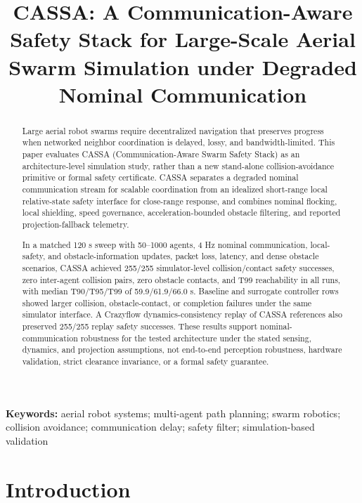 \documentclass[11pt]{article}
\title{\textbf{CASSA: A Communication-Aware Safety Stack for Large-Scale Aerial Swarm Simulation under Degraded Nominal Communication}}
\author{}
\date{}
\begin{document}
\maketitle

\begin{abstract}
Large aerial robot swarms require decentralized navigation that preserves progress when networked neighbor coordination is delayed, lossy, and bandwidth-limited. This paper evaluates CASSA (Communication-Aware Swarm Safety Stack) as an architecture-level simulation study, rather than a new stand-alone collision-avoidance primitive or formal safety certificate. CASSA separates a degraded nominal communication stream for scalable coordination from an idealized short-range local relative-state safety interface for close-range response, and combines nominal flocking, local shielding, speed governance, acceleration-bounded obstacle filtering, and reported projection-fallback telemetry.

In a matched 120 s sweep with 50--1000 agents, 4 Hz nominal communication, local-safety, and obstacle-information updates, packet loss, latency, and dense obstacle scenarios, CASSA achieved 255/255 simulator-level collision/contact safety successes, zero inter-agent collision pairs, zero obstacle contacts, and T99 reachability in all runs, with median T90/T95/T99 of 59.9/61.9/66.0 s. Baseline and surrogate controller rows showed larger collision, obstacle-contact, or completion failures under the same simulator interface. A Crazyflow dynamics-consistency replay of CASSA references also preserved 255/255 replay safety successes. These results support nominal-communication robustness for the tested architecture under the stated sensing, dynamics, and projection assumptions, not end-to-end perception robustness, hardware validation, strict clearance invariance, or a formal safety guarantee.
\end{abstract}

\noindent\textbf{Keywords:} aerial robot systems; multi-agent path planning; swarm robotics; collision avoidance; communication delay; safety filter; simulation-based validation

\section{Introduction}
\end{document}
